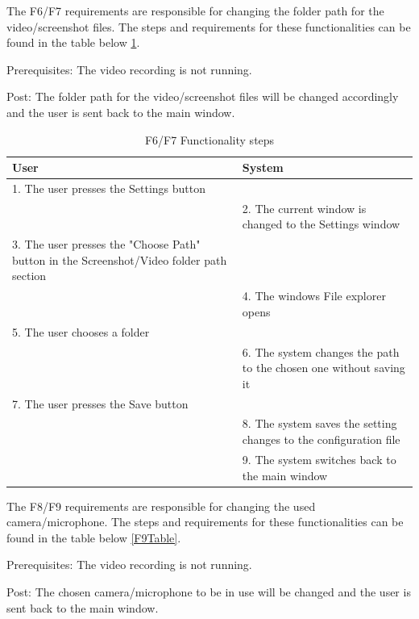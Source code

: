 \par The F6/F7 requirements are responsible for changing the folder path for the video/screenshot files. The steps and requirements for these functionalities can be found in the table below \ref{F7Table}.
\par Prerequisites: The video recording is not running.
\par Post: The folder path for the video/screenshot files will be changed accordingly and the user is sent back to the main window.

\begin{table}[htbp]
\begin{center}
\begin{tabular}
{|p{180pt}|p{180pt}|}
\hline
 User & System\\
\hline 
\hline 1. The user presses the Settings button &  \\
\hline  & 2. The current window is changed to the Settings window \\
\hline 3. The user presses the "Choose Path" button in the Screenshot/Video folder path section&  \\
\hline  & 4. The windows File explorer opens \\
\hline 5. The user chooses a folder &  \\
\hline  & 6. The system changes the path to the chosen one without saving it \\
\hline 7. The user presses the Save button &  \\
\hline  & 8. The system saves the setting changes to the configuration file \\
\hline  & 9. The system switches back to the main window \\
\hline
\end{tabular}
\end{center}
\caption{F6/F7 Functionality steps}
\label{F7Table}
\end{table}

\par The F8/F9 requirements are responsible for changing the used camera/microphone. The steps and requirements for these functionalities can be found in the table below \ref{F9Table}.
\par Prerequisites: The video recording is not running.
\par Post: The chosen camera/microphone to be in use will be changed and the user is sent back to the main window.


